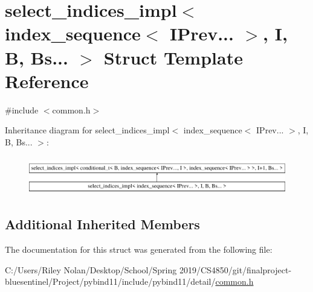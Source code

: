\hypertarget{structselect__indices__impl_3_01index__sequence_3_01_i_prev_8_8_8_01_4_00_01_i_00_01_b_00_01_bs_8_8_8_01_4}{}\section{select\+\_\+indices\+\_\+impl$<$ index\+\_\+sequence$<$ I\+Prev... $>$, I, B, Bs... $>$ Struct Template Reference}
\label{structselect__indices__impl_3_01index__sequence_3_01_i_prev_8_8_8_01_4_00_01_i_00_01_b_00_01_bs_8_8_8_01_4}


{\ttfamily \#include $<$common.\+h$>$}

Inheritance diagram for select\+\_\+indices\+\_\+impl$<$ index\+\_\+sequence$<$ I\+Prev... $>$, I, B, Bs... $>$\+:\begin{figure}[H]
\begin{center}
\leavevmode
\includegraphics[height=1.694402cm]{structselect__indices__impl_3_01index__sequence_3_01_i_prev_8_8_8_01_4_00_01_i_00_01_b_00_01_bs_8_8_8_01_4}
\end{center}
\end{figure}
\subsection*{Additional Inherited Members}


The documentation for this struct was generated from the following file\+:\begin{DoxyCompactItemize}
\item 
C\+:/\+Users/\+Riley Nolan/\+Desktop/\+School/\+Spring 2019/\+C\+S4850/git/finalproject-\/bluesentinel/\+Project/pybind11/include/pybind11/detail/\mbox{\hyperlink{detail_2common_8h}{common.\+h}}\end{DoxyCompactItemize}
